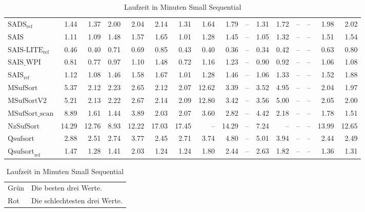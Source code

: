 \begin{table}[h]
{\begin{tabular}{lrrrrrrrrrrrrrrr}
    $\text{SADS}_{\text{ref}}$ & 1.44 & 1.37 & 2.00 & 2.04 & 2.14 & 1.31 & 1.64 & 1.79 & {\color{darkgray}--} & 1.31 & 1.72 & {\color{darkgray}--} & {\color{darkgray}--} & 1.98 & 2.02 \\
    $\text{SAIS}$ & 1.11 & 1.09 & 1.48 & 1.57 & 1.65 & 1.01 & 1.28 & 1.45 & {\color{darkgray}--} & 1.05 & 1.32 & {\color{darkgray}--} & {\color{darkgray}--} & 1.51 & 1.54 \\
    $\text{SAIS-LITE}_{\text{ref}}$ & {\color{green!60!black}0.46} & {\color{green!60!black}0.40} & 0.71 & 0.69 & 0.85 & {\color{green!60!black}0.43} & {\color{green!60!black}0.40} & {\color{green!60!black}0.36} & {\color{darkgray}--} & {\color{green!60!black}0.34} & {\color{green!60!black}0.42} & {\color{darkgray}--} & {\color{darkgray}--} & 0.63 & 0.80 \\
    $\text{SAIS\_WPI}$ & 0.81 & 0.77 & 0.97 & 1.10 & 1.48 & 0.72 & 1.16 & 1.23 & {\color{darkgray}--} & 0.90 & 0.92 & {\color{darkgray}--} & {\color{darkgray}--} & 1.06 & 1.08 \\
    $\text{SAIS}_{\text{ref}}$ & 1.12 & 1.08 & 1.46 & 1.58 & 1.67 & 1.01 & 1.28 & 1.46 & {\color{darkgray}--} & 1.06 & 1.33 & {\color{darkgray}--} & {\color{darkgray}--} & 1.52 & 1.88 \\
    $\text{MSufSort}$ & 5.37 & 2.12 & 2.23 & 2.65 & 2.12 & 2.07 & {\color{red}12.62} & 3.39 & {\color{darkgray}--} & 3.52 & 4.95 & {\color{darkgray}--} & {\color{darkgray}--} & 2.04 & 1.97 \\
    $\text{MSufSortV2}$ & 5.21 & 2.13 & 2.22 & 2.67 & 2.14 & 2.09 & {\color{red}12.80} & 3.42 & {\color{darkgray}--} & 3.56 & 5.00 & {\color{darkgray}--} & {\color{darkgray}--} & 2.05 & 2.00 \\
    $\text{MSufSort\_scan}$ & 8.89 & 1.61 & 1.44 & 3.89 & 2.03 & 2.07 & 3.60 & 2.82 & {\color{darkgray}--} & 4.42 & 2.18 & {\color{darkgray}--} & {\color{darkgray}--} & 1.78 & 1.51 \\
    $\text{NzSufSort}$ & {\color{red}14.29} & {\color{red}12.76} & {\color{red}8.93} & 12.22 & {\color{red}17.03} & {\color{red}17.45} & {\color{darkgray}--} & 14.29 & {\color{darkgray}--} & 7.24 & {\color{darkgray}--} & {\color{darkgray}--} & {\color{darkgray}--} & {\color{red}13.99} & {\color{red}12.65} \\
    $\text{Qsufsort}$ & 2.88 & 2.51 & 2.74 & 3.77 & 2.45 & 2.71 & 3.74 & 4.80 & {\color{darkgray}--} & 5.01 & 3.94 & {\color{darkgray}--} & {\color{darkgray}--} & 2.44 & 2.49 \\
    $\text{Qsufsort}_{\text{ref}}$ & 1.47 & 1.28 & 1.41 & 2.03 & 1.24 & 1.24 & 1.80 & 2.44 & {\color{darkgray}--} & 2.63 & 1.82 & {\color{darkgray}--} & {\color{darkgray}--} & 1.36 & 1.31 \\
\bottomrule
\end{tabular}
}
\caption{Laufzeit in Minuten Small Sequential}
\label{messung:tab:time-small-seq-none}
\begin{tabular}{ll}
{\color{green}Grün} & Die besten drei Werte.\\
{\color{red}Rot} & Die schlechtesten drei Werte.\\
\end{tabular}
\end{table}
